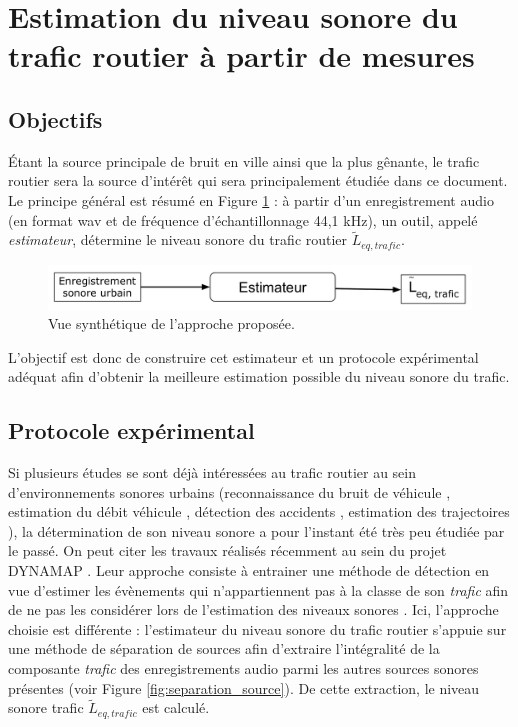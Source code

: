 \section{Estimation du niveau sonore du trafic routier à partir de mesures} \label{part:cachier_charges}

\subsection{Objectifs}
Étant la source principale de bruit en ville ainsi que la plus gênante, le trafic routier sera la source d'intérêt qui sera principalement étudiée dans ce document. Le principe général est résumé en Figure \ref{fig:estimateur0} : à partir d'un enregistrement audio (en format wav et de fréquence d'échantillonnage 44,1 kHz), un outil, appelé \textit{estimateur}, détermine le niveau sonore du trafic routier $\tilde{L}_{eq,trafic}$.

\begin{figure}[t]
\centering
\includegraphics[width=0.7\linewidth]{./figures/NMF/bloc_diagram_estimateur0.pdf}
\caption{Vue synthétique de l'approche proposée.}
\label{fig:estimateur0}
\end{figure}

L'objectif est donc de construire cet estimateur et un protocole expérimental adéquat afin d'obtenir la meilleure estimation possible du niveau sonore du trafic.

\subsection{Protocole expérimental}

Si plusieurs études se sont déjà intéressées au trafic routier au sein d'environnements sonores urbains (reconnaissance du bruit de véhicule \cite{defreville_automatic_2006}, estimation du débit véhicule \cite{torija2012using}, détection des accidents \cite{harlow2001automated}, estimation des trajectoires \cite{leiba2017large}), la détermination de son niveau sonore a pour l'instant été très peu étudiée par le passé. On peut citer les travaux réalisés récemment au sein du projet DYNAMAP \cite{socoro2017anomalous}. Leur approche consiste à entrainer une méthode de détection en vue d'estimer les évènements qui n'appartiennent pas à la classe de son \textit{trafic} afin de ne pas les considérer lors de l'estimation des niveaux sonores . Ici, l'approche choisie est différente : l'estimateur du niveau sonore du trafic routier s'appuie sur une méthode de séparation de sources afin d'extraire l'intégralité de la composante \textit{trafic} des enregistrements audio parmi les autres sources sonores présentes (voir Figure \ref{fig:separation_source}). De cette extraction, le niveau sonore trafic $\tilde{L}_{eq,trafic}$ est calculé.

